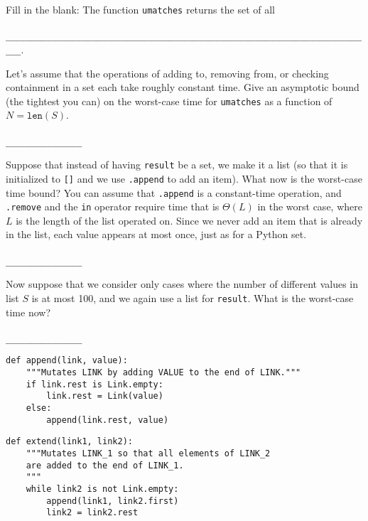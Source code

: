 \documentclass[twoside]{article}
\begin{document}
\begin{enumerate}
\begin{enumerate}
Fill in the blank: The function \texttt{umatches} returns the set of all\\\\
\lstinline{_________________________________________________________________________}.

Let's assume that the operations of adding to, removing from, or checking containment in a set each take roughly constant time. Give an asymptotic bound (the tightest you can) on the worst-case time for \texttt{umatches} as a function of $N = \texttt{len}(S)$.
~\\\\
\lstinline{_______________}

Suppose that instead of having \texttt{result} be a set, we make it a list (so that it is initialized to \texttt{[]} and we use \texttt{.append} to add an item). What now is the worst-case time bound? You can assume that \texttt{.append} is a constant-time operation, and \texttt{.remove} and the \texttt{in} operator require time that is $\Theta(L)$ in the worst case, where $L$ is the length of the list operated on. Since we never add an item that is already in the list, each value appears at most once, just as for a Python set.
~\\\\
\lstinline{_______________}

Now suppose that we consider only cases where the number of different values in list $S$ is at most 100, and we again use a list for \texttt{result}. What is the worst-case time now?
~\\\\
\lstinline{_______________}
\end{enumerate}


\begin{lstlisting}
def append(link, value):
    """Mutates LINK by adding VALUE to the end of LINK."""
    if link.rest is Link.empty:
        link.rest = Link(value)
    else:
        append(link.rest, value)
\end{lstlisting}

\newpage

\begin{lstlisting}
def extend(link1, link2):
    """Mutates LINK_1 so that all elements of LINK_2
    are added to the end of LINK_1.
    """
    while link2 is not Link.empty:
        append(link1, link2.first)
        link2 = link2.rest
\end{lstlisting}


\end{enumerate}
\end{document}
